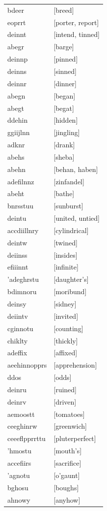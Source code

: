 \documentclass{article}
\begin{document}
\begin{tabular}{ll}
bdeer & [breed] \\
eoprrt & [porter, report] \\
deinnt & [intend, tinned] \\
abegr & [barge] \\
deinnp & [pinned] \\
deinns & [sinned] \\
deinnr & [dinner] \\
abegn & [began] \\
abegt & [begat] \\
ddehin & [hidden] \\
ggiijlnn & [jingling] \\
adknr & [drank] \\
abehs & [sheba] \\
abehn & [behan, haben] \\
adefilnnz & [zinfandel] \\
abeht & [bathe] \\
bnrsstuu & [sunburst] \\
deintu & [united, untied] \\
accdiillnry & [cylindrical] \\
deintw & [twined] \\
deiinss & [insides] \\
efiiinnt & [infinite] \\
'adeghrstu & [daughter's] \\
bdimnoru & [moribund] \\
deinsy & [sidney] \\
deiintv & [invited] \\
cginnotu & [counting] \\
chiklty & [thickly] \\
adeffix & [affixed] \\
aeehinnopprs & [apprehension] \\
ddos & [odds] \\
deinru & [ruined] \\
deinrv & [driven] \\
aemoostt & [tomatoes] \\
ceeghinrw & [greenwich] \\
ceeeflpprrttu & [pluterperfect] \\
'hmostu & [mouth's] \\
accefiirs & [sacrifice] \\
'agnotu & [o'gaunt] \\
bghosu & [boughs] \\
ahnowy & [anyhow] \\

\end{tabular}
\end{document}
